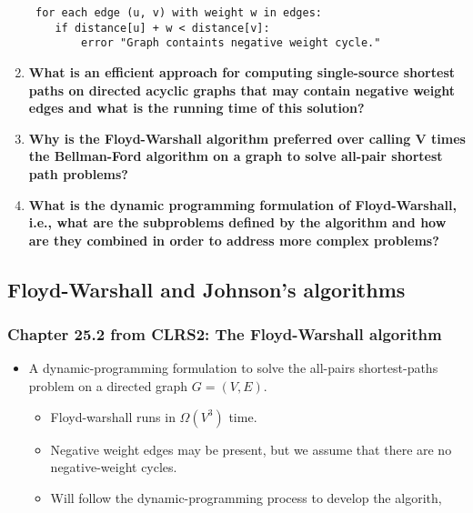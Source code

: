 \documentclass[a4paper,11pt]{article}
\begin{document}
\begin{enumerate}
\begin{verbatim}
 for each edge (u, v) with weight w in edges:
    if distance[u] + w < distance[v]:
        error "Graph containts negative weight cycle."
\end{verbatim}
\item
  \textbf{What is an efficient approach for computing single-source
  shortest paths on directed acyclic graphs that may contain negative
  weight edges and what is the running time of this solution?}
\item
  \textbf{Why is the Floyd-Warshall algorithm preferred over calling
  \textbar{}V\textbar{} times the Bellman-Ford algorithm on a graph to
  solve all-pair shortest path problems?}
\item
  \textbf{What is the dynamic programming formulation of Floyd-Warshall,
  i.e., what are the subproblems defined by the algorithm and how are
  they combined in order to address more complex problems?}
\end{enumerate}

\subsection{Floyd-Warshall and Johnson's
algorithms}\label{floyd-warshall-and-johnsons-algorithms}

\subsubsection{Chapter 25.2 from CLRS2: The Floyd-Warshall
algorithm}\label{chapter-25.2-from-clrs2-the-floyd-warshall-algorithm}

\begin{itemize}
\itemsep1pt\parskip0pt
\item
  A dynamic-programming formulation to solve the all-pairs
  shortest-paths problem on a directed graph $G = (V, E)$.

  \begin{itemize}
  \itemsep1pt\parskip0pt
  \item
    Floyd-warshall runs in $\Omega(V^3)$ time.
  \item
    Negative weight edges may be present, but we assume that there are
    no negative-weight cycles.
  \item
    Will follow the dynamic-programming process to develop the algorith,
  \end{itemize}
\end{itemize}
\end{document}
